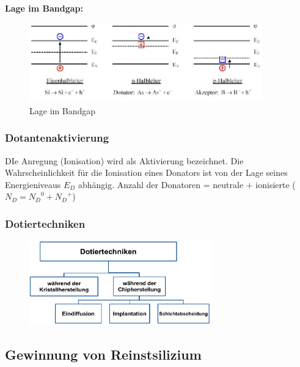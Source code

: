 		\newpage
		\textbf{Lage im Bandgap:}
		\begin{figure}[h!]
			\centering
			\includegraphics[width=0.9\textwidth]{Kapitel/Kap02/bandgapLage.PNG}
			\caption{Lage im Bandgap}
			\label{02_bandgap}
		\end{figure}
		
	\subsubsection{Dotantenaktivierung}
	DIe Anregung (Ionisation) wird als Aktivierung bezeichnet. Die Wahrscheinlichkeit für die Ionisation eines Donators ist von der Lage seines Energieniveaus $E_D$ abhängig. 
	Anzahl der Donatoren = neutrale + ionisierte ($N_D = {N_D}^0 + {N_D}^+$)
	\newpage
	
	\subsubsection{Dotiertechniken}
		\begin{figure}[h!]
			\centering
			\includegraphics[width=0.7\textwidth]{Kapitel/Kap02/dotiertechniken.PNG}
			\label{02_dotiertechniken}
		\end{figure}
		
\subsection{Gewinnung von Reinstsilizium}

